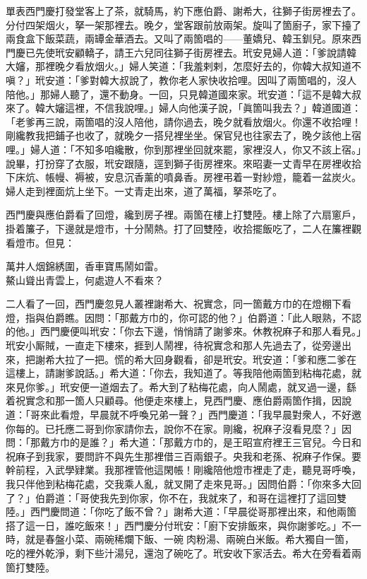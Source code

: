 單表西門慶打發堂客上了茶，就騎馬，約下應伯爵、謝希大，往獅子街房裡去了。分付四架烟火，拏一架那裡去。晚夕，堂客跟前放兩架。旋叫了箇廚子，家下擡了兩食盒下飯菜蔬，兩罈金華酒去。又叫了兩箇唱的——董嬌兒、韓玉釧兒。原來西門慶已先使玳安顧轎子，請王六兒同往獅子街房裡去。玳安見婦人道：「爹說請韓大嬸，那裡晚夕看放烟火。」婦人笑道：「我羞剌剌，怎麼好去的，你韓大叔知道不嗔？」玳安道：「爹對韓大叔說了，教你老人家快收拾哩。因叫了兩箇唱的，沒人陪他。」那婦人聽了，還不動身。一回，只見韓道國來家。玳安道：「這不是韓大叔來了。韓大嬸這裡，不信我說哩。」婦人向他漢子說，「眞箇叫我去？」韓道國道：「老爹再三說，兩箇唱的沒人陪他，請你過去，晚夕就看放烟火。你還不收拾哩！剛纔教我把鋪子也收了，就晚夕一搭兒裡坐坐。保官兒也往家去了，晚夕該他上宿哩。」婦人道：「不知多咱纔散，你到那裡坐回就來罷，家裡沒人，你又不該上宿。」說畢，打扮穿了衣服，玳安跟隨，逕到獅子街房裡來。來昭妻一丈青早在房裡收拾下床炕、帳幔、褥被，安息沉香薰的噴鼻香。{}房裡弔着一對紗燈，籠着一盆炭火。婦人走到裡面炕上坐下。一丈青走出來，道了萬福，拏茶吃了。

西門慶與應伯爵看了回燈，纔到房子裡。兩箇在樓上打雙陸。樓上除了六扇窻戶，掛着簾子，下邊就是燈市，十分鬧熱。打了回雙陸，收拾擺飯吃了，二人在簾裡觀看燈市。但見：

\begin{myquote}
萬井人烟錦綉圍，香車寶馬鬧如雷。\\鰲山聳出青雲上，何處遊人不看來？
\end{myquote}

二人看了一回，西門慶忽見人叢裡謝希大、祝實念，同一箇戴方巾的在燈棚下看燈，指與伯爵瞧。因問：「那戴方巾的，你可認的他？」伯爵道：「此人眼熟，不認的他。」西門慶便叫玳安：「你去下邊，悄悄請了謝爹來。休教祝麻子和那人看見。」玳安小厮賊，一直走下樓來，捱到人鬧裡，待祝實念和那人先過去了，從旁邊出來，把謝希大拉了一把。慌的希大回身觀看，卻是玳安。玳安道：「爹和應二爹在這樓上，請謝爹說話。」希大道：「你去，我知道了。等我陪他兩箇到粘梅花處，就來見你爹。」玳安便一道烟去了。希大到了粘梅花處，向人鬧處，就叉過一邊，繇着祝實念和那一箇人只顧尋。他便走來樓上，{}見西門慶、應伯爵兩箇作揖，因說道：「哥來此看燈，早晨就不呼喚兄弟一聲？」西門慶道：「我早晨對衆人，不好邀你每的。已托應二哥到你家請你去，說你不在家。剛纔，祝麻子沒看見麼？」因問：「那戴方巾的是誰？」希大道：「那戴方巾的，是王昭宣府裡王三官兒。今日和祝麻子到我家，要問許不與先生那裡借三百兩銀子。央我和老孫、祝麻子作保。要幹前程，入武學肄業。我那裡管他這閑帳！剛纔陪他燈市裡走了走，聽見哥呼喚，我只伴他到粘梅花處，交我乘人亂，就叉開了走來見哥。」因問伯爵：「你來多大回了？」伯爵道：「哥使我先到你家，你不在，我就來了，和哥在這裡打了這回雙陸。」西門慶問道：「你吃了飯不曾？」謝希大道：「早晨從哥那裡出來，和他兩箇搭了這一日，誰吃飯來！」西門慶分付玳安：「廚下安排飯來，與你謝爹吃。」不一時，就是春盤小菜、兩碗稀爛下飯、一碗𤆑肉粉湯、兩碗白米飯。希大獨自一箇，吃的裡外乾淨，剩下些汁湯兒，還泡了碗吃了。玳安收下家活去。希大在旁看着兩箇打雙陸。

